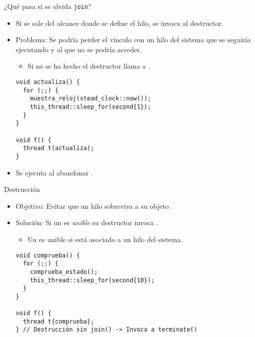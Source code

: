 \begin{frame}[fragile]{¿Qué pasa si se olvida \texttt{join}?}
\begin{itemize}
  \item Si se sale del alcance donde se define el hilo, se invoca al destructor.
  \item \alert{Problema}: Se podría perder el vínculo con un hilo del sistema que se seguiría
        ejecutando y al que no se podría acceder.
    \begin{itemize}
      \item Si no se ha hecho  el destructor llama a .
    \end{itemize}
\begin{lstlisting}
void actualiza() {
  for (;;) {
    muestra_reloj(stead_clock::now());
    this_thread::sleep_for(second{1});
  }
}

void f() {
  thread t(actualiza);
}
\end{lstlisting}
  \item Se ejecuta  al abandonar .
\end{itemize}
\end{frame}

\begin{frame}[fragile]{Destrucción}
\begin{itemize}
  \item Objetivo: Evitar que un hilo sobreviva a su objeto .
  \item Solución: Si un  es \emph{unible} su destructor invoca .
    \begin{itemize}
      \item Un  es unible si está asociado a un hilo del sistema.
    \end{itemize}
\begin{lstlisting}
void comprueba() {
  for (;;) {
    comprueba_estado();
    this_thread::sleep_for(second{10});
  }
}

void f() {
  thread t{comprueba};
} // Destrucción sin join() -> Invoca a terminate()
\end{lstlisting}
\end{itemize}
\end{frame}

